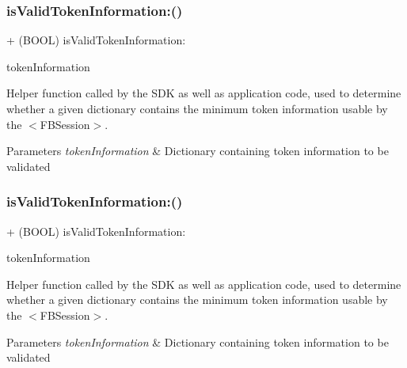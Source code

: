 \subsubsection{\texorpdfstring{is\+Valid\+Token\+Information\+:()}{isValidTokenInformation:()}\hspace{0.1cm}{\footnotesize\ttfamily [1/5]}}
{\footnotesize\ttfamily + (B\+O\+OL) is\+Valid\+Token\+Information\+: \begin{DoxyParamCaption}\item[{(N\+S\+Dictionary $\ast$)}]{token\+Information }\end{DoxyParamCaption}}

Helper function called by the S\+DK as well as application code, used to determine whether a given dictionary contains the minimum token information usable by the $<$\+F\+B\+Session$>$.


\begin{DoxyParams}{Parameters}
{\em token\+Information} & Dictionary containing token information to be validated \\
\hline
\end{DoxyParams}
\mbox{\label{interfaceFBSessionTokenCachingStrategy_a3974571bceb0745f400bf2a6674a963f}} 
\subsubsection{\texorpdfstring{is\+Valid\+Token\+Information\+:()}{isValidTokenInformation:()}\hspace{0.1cm}{\footnotesize\ttfamily [2/5]}}
{\footnotesize\ttfamily + (B\+O\+OL) is\+Valid\+Token\+Information\+: \begin{DoxyParamCaption}\item[{(N\+S\+Dictionary $\ast$)}]{token\+Information }\end{DoxyParamCaption}}

Helper function called by the S\+DK as well as application code, used to determine whether a given dictionary contains the minimum token information usable by the $<$\+F\+B\+Session$>$.


\begin{DoxyParams}{Parameters}
{\em token\+Information} & Dictionary containing token information to be validated \\
\hline
\end{DoxyParams}
\mbox{\label{interfaceFBSessionTokenCachingStrategy_a3974571bceb0745f400bf2a6674a963f}} 
